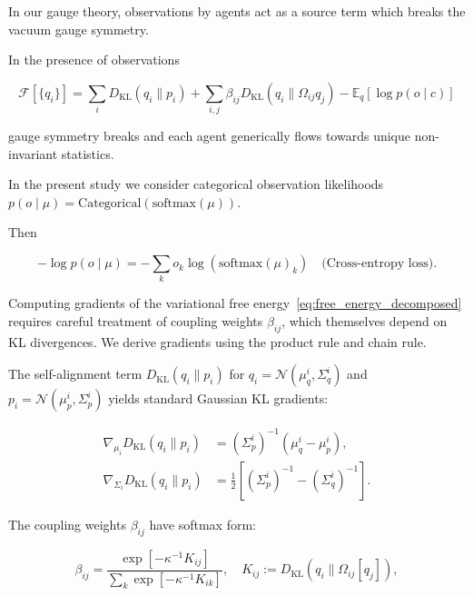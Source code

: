 \documentclass[twoside,11pt]{article}
\begin{document}
In our gauge theory, observations by agents act as a source term which breaks the vacuum gauge symmetry.

In the presence of observations   

\begin{equation}
\mathcal{F}[\{q_i\}] = 
\sum_i D_{\mathrm{KL}}(q_i \| p_i)
+ \sum_{i,j} \beta_{ij} D_{\mathrm{KL}}(q_i \| \Omega_{ij} q_j)
- \mathbb{E}_q[\log p(o \mid c)]
\label{eq:free_energy_decomposed}
\end{equation}

gauge symmetry breaks and each agent generically flows towards unique non-invariant statistics.  

In the present study we consider categorical observation likelihoods $p(o \mid \mu) = \mathrm{Categorical}(\mathrm{softmax}(\mu))$.

Then

\begin{equation}
-\log p(o \mid \mu) = -\sum_k o_k \log(\mathrm{softmax}(\mu)_k) \quad \text{(Cross-entropy loss)}.
\end{equation}



Computing gradients of the variational free energy~\eqref{eq:free_energy_decomposed} requires careful treatment of coupling weights $\beta_{ij}$, which themselves depend on KL divergences. We derive gradients using the product rule and chain rule.

The self-alignment term $D_{\mathrm{KL}}(q_i \| p_i)$ for $q_i = \mathcal{N}(\mu_q^i, \Sigma_q^i)$ and $p_i = \mathcal{N}(\mu_p^i, \Sigma_p^i)$ yields standard Gaussian KL gradients:

\begin{align}
\nabla_{\mu_i} D_{\mathrm{KL}}(q_i \| p_i) &= (\Sigma_p^i)^{-1}(\mu_q^i - \mu_p^i), \label{eq:grad_mu_self} \\
\nabla_{\Sigma_i} D_{\mathrm{KL}}(q_i \| p_i) &= \tfrac{1}{2}\left[(\Sigma_p^i)^{-1} - (\Sigma_q^i)^{-1}\right]. \label{eq:grad_sigma_self}
\end{align}

The coupling weights $\beta_{ij}$ have softmax form:

\begin{equation}
\beta_{ij} = \frac{\exp\!\left[-\kappa^{-1} K_{ij}\right]}{\sum_k \exp\!\left[-\kappa^{-1} K_{ik}\right]},
\quad K_{ij} := D_{\mathrm{KL}}(q_i \| \Omega_{ij}[q_j]),
\label{eq:beta_def}
\end{equation}
\end{document}
